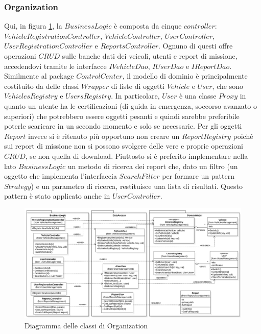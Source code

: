 \documentclass{article}
\begin{document}
    \subsubsection{Organization}
    Qui, in figura \ref{fig:uml-organization}, la $BusinessLogic$ è composta da cinque $controller$: $VehicleRegistrationController$, $VehicleController$, $UserController$, $UserRegistrationController$ e $ReportsController$.
    Ognuno di questi offre operazioni $CRUD$ sulle banche dati dei veicoli, utenti e report di missione, accedendovi tramite le interfacce $IVehicleDao$, $IUserDao$ e $IReportDao$.
    Similmente al package $ControlCenter$, il modello di dominio è principalmente costituito da delle classi $Wrapper$ di liste di oggetti $Vehicle$ e $User$, che sono $VehiclesRegistry$ e $UsersRegistry$.
    In particolare, $User$ è una classe $Proxy$ in quanto un utente ha le certificazioni (di guida in emergenza, soccorso avanzato o superiori) che potrebbero essere oggetti pesanti e quindi sarebbe preferibile poterle scaricare in un secondo momento e solo se necessarie.
    \newline Per gli oggetti $Report$ invece si è ritenuto più opportuno non creare un $ReportRegistry$ poiché sui report di missione non si possono svolgere delle vere e proprie operazioni $CRUD$, se non quella di download.
    Piuttosto si è preferito implementare nella lato $BusinessLogic$ un metodo di ricerca dei report che, dato un filtro (un oggetto che implementa l'interfaccia $SearchFilter$ per formare un pattern $Strategy$) e un parametro di ricerca, restituisce una lista di risultati.
    Questo pattern è stato applicato anche in $UserController$.
    \begin{figure}[!h]
        \centering
        \includegraphics[width=6in]{diagrams/png/uml-organization.png}
        \caption{Diagramma delle classi di Organization}
        \label{fig:uml-organization}
    \end{figure}
\end{document}
